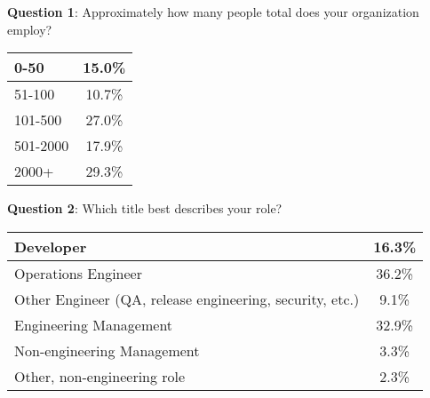 
\label{app:survey_ques_results}

\begin{samepage}
\noindent
\textbf{Question 1}: Approximately how many people total does your organization employ? \newline

\nopagebreak
\medskip
\begin{tabular}{| p{5.0in} | c |}
\hline
	0-50 & 15.0\% \\
\hline
	51-100 & 10.7\% \\
\hline
	101-500 & 27.0\% \\
\hline
	501-2000 & 17.9\% \\
\hline
	2000+ &  29.3\% \\
\hline
\end{tabular}
\end{samepage}

\par
\bigskip

\begin{samepage}
\noindent
\textbf{Question 2}: Which title best describes your role? \newline

\nopagebreak
\medskip
\begin{tabular}{| p{5.0in} | c |}
\hline
	Developer & 16.3\% \\
\hline
	Operations Engineer & 36.2\% \\
\hline
	Other Engineer (QA, release engineering, security, etc.) & 9.1\% \\
\hline
	Engineering Management & 32.9\% \\
\hline
	Non-engineering Management &  3.3\% \\
\hline
	Other, non-engineering role &  2.3\% \\
\hline
\end{tabular}
\end{samepage}
